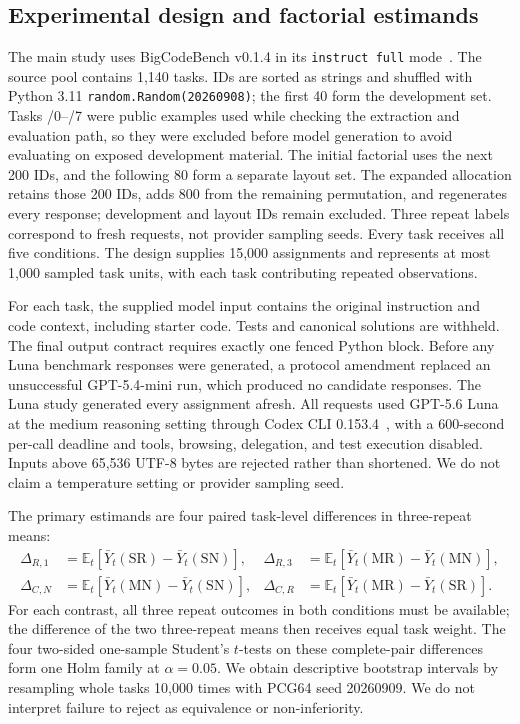 \documentclass[pdflatex,sn-nature]{scientificreports}
\begin{document}
\subsection{Experimental design and factorial estimands}
The main study uses BigCodeBench v0.1.4 in its \texttt{instruct full} mode~\cite{zhuo2024bigcodebench}. The source pool contains 1,140 tasks. IDs are sorted as strings and shuffled with Python 3.11 \texttt{random.Random(20260908)}; the first 40 form the development set. Tasks /0--/7 were public examples used while checking the extraction and evaluation path, so they were excluded before model generation to avoid evaluating on exposed development material. The initial factorial uses the next 200 IDs, and the following 80 form a separate layout set. The expanded allocation retains those 200 IDs, adds 800 from the remaining permutation, and regenerates every response; development and layout IDs remain excluded. Three repeat labels correspond to fresh requests, not provider sampling seeds. Every task receives all five conditions. The design supplies 15,000 assignments and represents at most 1,000 sampled task units, with each task contributing repeated observations.

For each task, the supplied model input contains the original instruction and code context, including starter code. Tests and canonical solutions are withheld. The final output contract requires exactly one fenced Python block. Before any Luna benchmark responses were generated, a protocol amendment replaced an unsuccessful GPT-5.4-mini run, which produced no candidate responses. The Luna study generated every assignment afresh. All requests used GPT-5.6 Luna at the medium reasoning setting through Codex CLI 0.153.4~\cite{openai56luna2026,codexexec2026}, with a 600-second per-call deadline and tools, browsing, delegation, and test execution disabled. Inputs above 65,536 UTF-8 bytes are rejected rather than shortened. We do not claim a temperature setting or provider sampling seed.

The primary estimands are four paired task-level differences in three-repeat means:
\begin{align}
\Delta_{R,1}&=\mathbb{E}_t[\bar Y_t(\mathrm{SR})-\bar Y_t(\mathrm{SN})], &
\Delta_{R,3}&=\mathbb{E}_t[\bar Y_t(\mathrm{MR})-\bar Y_t(\mathrm{MN})],\\
\Delta_{C,N}&=\mathbb{E}_t[\bar Y_t(\mathrm{MN})-\bar Y_t(\mathrm{SN})], &
\Delta_{C,R}&=\mathbb{E}_t[\bar Y_t(\mathrm{MR})-\bar Y_t(\mathrm{SR})].
\end{align}
For each contrast, all three repeat outcomes in both conditions must be available; the difference of the two three-repeat means then receives equal task weight. The four two-sided one-sample Student's $t$-tests on these complete-pair differences form one Holm family at $\alpha=0.05$. We obtain descriptive bootstrap intervals by resampling whole tasks 10,000 times with PCG64 seed 20260909. We do not interpret failure to reject as equivalence or non-inferiority.
\end{document}
